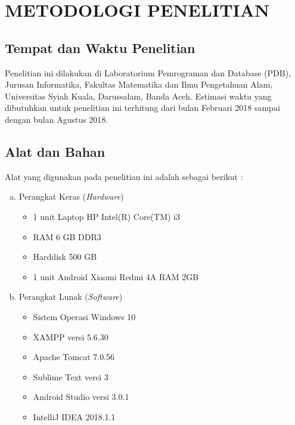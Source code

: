 
\chapter{METODOLOGI PENELITIAN}

\section{Tempat dan Waktu Penelitian}
\setlength\parindent{30pt} Penelitian ini dilakukan di Laboratorium Pemrograman dan Database (PDB), Jurusan Informatika, Fakultas Matematika dan Ilmu Pengetahuan Alam, Universitas Syiah Kuala, Darussalam, Banda Aceh. Estimasi waktu yang dibutuhkan untuk penelitian ini terhitung dari bulan Februari 2018 sampai dengan bulan Agustus 2018.

\section{Alat dan Bahan}
Alat yang digunakan pada penelitian ini adalah sebagai berikut :

\begin{enumerate}[a.]
\item Perangkat Keras (\textit{Hardware})
	\begin{itemize}
		\item 1 unit Laptop HP Intel(R) Core(TM) i3
		\item RAM 6 GB DDR3
		\item Harddisk 500 GB
		\item 1 unit Android Xiaomi Redmi 4A RAM 2GB
	\end{itemize}

\item Perangkat Lunak (\textit{Software})
	\begin{itemize}
		\item Sistem Operasi Windows 10
		\item XAMPP versi 5.6.30
		\item Apache Tomcat 7.0.56
		\item Sublime Text versi 3
		\item Android Studio versi 3.0.1
		\item IntelliJ IDEA 2018.1.1

	\end{itemize}
\end{enumerate}

